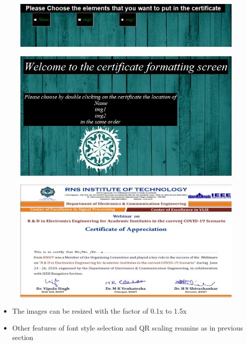 \begin{figure}[H]
	\centering
	\includegraphics[width=0.75\linewidth]{"images/image_on_cert/Screenshot (85)"}
	\label{fig:screenshot-85}
\end{figure}
\begin{figure}[H]
	\centering
	\includegraphics[width=0.7\linewidth]{"images/image_on_cert/Screenshot (89)"}
	\label{fig:screenshot-89}
\end{figure}
\begin{figure}[H]
	\centering
	\includegraphics[width=0.75\linewidth]{"images/image_on_cert/Screenshot (95)"}
	\label{fig:screenshot-95}
\end{figure}

\newpage
\begin{itemize}
	\item The images can be resized with the factor of 0.1x to 1.5x
	\item Other features of font style selection and QR scaling reamins as in previous section
\end{itemize}

